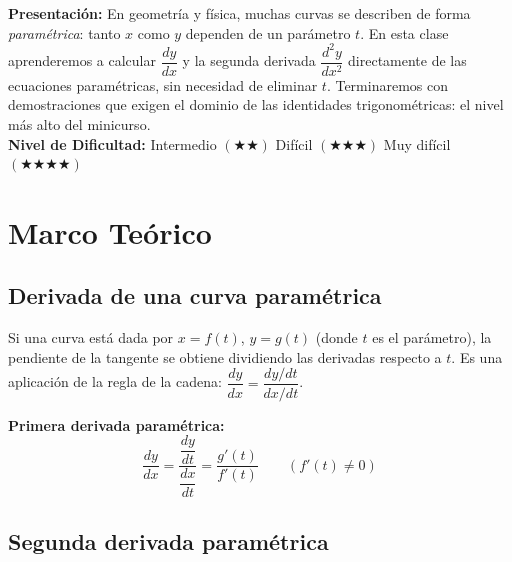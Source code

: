 \documentclass[12pt, letterpaper]{article}
\begin{document}


\vspace{4pt}
\begin{cuadroinfo}
  \small
  \textbf{Presentación:} En geometría y física, muchas curvas se describen de forma \emph{paramétrica}: tanto $x$ como $y$ dependen de un parámetro $t$. En esta clase aprenderemos a calcular $\dfrac{dy}{dx}$ y la segunda derivada $\dfrac{d^2y}{dx^2}$ directamente de las ecuaciones paramétricas, sin necesidad de eliminar $t$. Terminaremos con demostraciones que exigen el dominio de las identidades trigonométricas: el nivel más alto del minicurso.
  \\[6pt]
  \textbf{Nivel de Dificultad:}\quad
  \medio{} Intermedio $(\bigstar\bigstar)$ \quad
  \dificil{} Difícil $(\bigstar\bigstar\bigstar)$ \quad
  \muyDificil{} Muy difícil $(\bigstar\bigstar\bigstar\bigstar)$
\end{cuadroinfo}

\vspace{8pt}

\section{Marco Teórico}

\subsection{Derivada de una curva paramétrica}

Si una curva está dada por $x = f(t)$, $y = g(t)$ (donde $t$ es el parámetro), la pendiente de la tangente se obtiene dividiendo las derivadas respecto a $t$. Es una aplicación de la regla de la cadena: $\dfrac{dy}{dx} = \dfrac{dy/dt}{dx/dt}$.

\begin{cuadroteoria}
  \textbf{Primera derivada paramétrica:}
  \[
    \frac{dy}{dx} = \frac{\dfrac{dy}{dt}}{\dfrac{dx}{dt}} = \frac{g'(t)}{f'(t)} \qquad (f'(t) \neq 0)
  \]
\end{cuadroteoria}

\subsection{Segunda derivada paramétrica}
\end{document}
